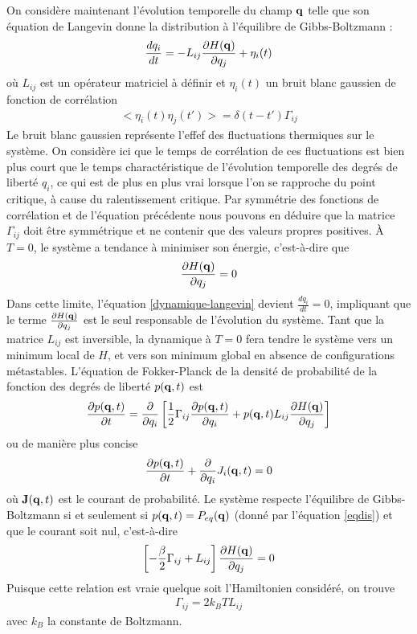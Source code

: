 On considère maintenant l'évolution temporelle du champ ${\bf q}$ telle que son équation de Langevin donne la distribution à l'équilibre de Gibbs-Boltzmann : 
\begin{align}
    \frac{d q_i}{dt} = -L_{ij}\frac{\partial H({\bf q})}{ \partial q_j} + \eta_i(t)
    \label{dynamique-langevin}
\end{align}
où $L_{ij}$ est un opérateur matriciel à définir et $\eta_i(t)$ un bruit blanc gaussien de fonction de corrélation
\begin{align}
   <  \eta_i(t)\eta_j(t') > =   \delta(t-t') \Gamma_{ij}
\end{align}
Le bruit blanc gaussien représente l'effef des fluctuations thermiques sur le système. On considère ici que le temps de corrélation de ces fluctuations est bien plus court que le temps charactéristique de l'évolution temporelle des degrés de liberté $q_i$, ce qui est de plus en plus vrai lorsque l'on se rapproche du point critique, à cause du ralentissement critique. Par symmétrie des fonctions de corrélation et de l'équation précédente nous pouvons en déduire que la matrice $\Gamma_{ij}$ doit être symmétrique et ne contenir que des valeurs propres positives.
À $T=0$, le système a tendance à minimiser son énergie, c'est-à-dire que
\begin{align}
    \frac{\partial H({\bf q})}{ \partial q_j} = 0
\end{align}
Dans cette limite, l'équation \ref{dynamique-langevin} devient $\frac{d q_i}{dt}=0$, impliquant que le terme $\frac{\partial H({\bf q})}{ \partial q_j}$ est le seul responsable de l'évolution du système.
Tant que la matrice $L_{ij}$ est inversible, la dynamique à $T=0$ fera tendre le système vers un minimum local de $H$, et vers son minimum global en absence de configurations métastables.
L'équation de Fokker-Planck de la densité de probabilité de la fonction des degrés de liberté $p({\bf q},t)$ est 
\begin{align}
    \frac{\partial p({\bf q},t)}{\partial t} = \frac{\partial}{\partial q_i} \left[\frac{1}{2}\Gamma_{ij}                 \frac{\partial p({\bf q},t)}{\partial q_i} + p({\bf q},t) L_{ij}\frac{\partial H({\bf q})}{ \partial q_j}\right]
\end{align}
ou de manière plus concise
\begin{align}
    \frac{\partial p({\bf q},t)}{\partial t} +\frac{\partial}{\partial q_i}J_i({\bf q},t)=0
    \label{courant}
\end{align}
où  ${\bf J}({\bf q},t)$ est le courant de probabilité. Le système respecte l'équilibre de Gibbs-Boltzmann si et seulement si $p({\bf q},t)=P_{eq}({\bf q})$ (donné par l'équation \ref{eqdis}) et que le courant soit nul, c'est-à-dire
\begin{align}
    \left[-\frac{\beta}{2}\Gamma_{ij} + L_{ij}\right]\frac{\partial H({\bf q})}{ \partial q_j} = 0
\end{align}
Puisque cette relation est vraie quelque soit l'Hamiltonien considéré, on trouve  
\begin{align}
    \Gamma_{ij}= 2 k_B T L_{ij}
\end{align}
avec $k_B$ la constante de Boltzmann.

